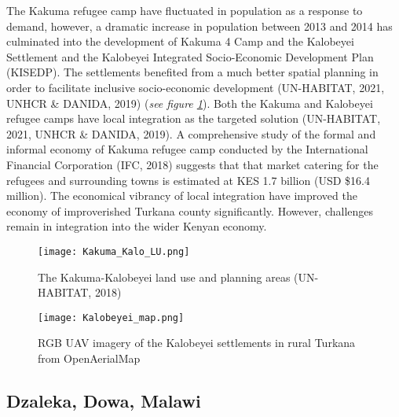 \documentclass[11pt, a4paper, twoside]{report}
\begin{document}
The Kakuma refugee camp have fluctuated in population as a response to demand, however, a dramatic increase in population between 2013 and 2014 has culminated into the development of Kakuma 4 Camp and the Kalobeyei Settlement and the Kalobeyei Integrated Socio-Economic Development Plan (KISEDP). The settlements benefited from a much better spatial planning in order to facilitate inclusive socio-economic development (UN-HABITAT, 2021, UNHCR \& DANIDA, 2019) (\textit{see figure \ref{fig:KU_KALO_LU}}). Both the Kakuma and Kalobeyei refugee camps have local integration as the targeted solution (UN-HABITAT, 2021, UNHCR \& DANIDA, 2019). A comprehensive study of the formal and informal economy of Kakuma refugee camp conducted by the International Financial Corporation (IFC, 2018) suggests that that market catering for the refugees and surrounding towns is estimated at KES 1.7 billion (USD \$16.4 million). The economical vibrancy of local integration have improved the economy of improverished Turkana county significantly. However, challenges remain in integration into the wider Kenyan economy.\\\par

\begin{figure}[H]
  \centering
  \texttt{[image: Kakuma\_Kalo\_LU.png]}
  \caption{The Kakuma-Kalobeyei land use and planning areas (UN-HABITAT, 2018)}
  \label{fig:KU_KALO_LU}
\end{figure}

\begin{figure}[H]
  \centering
  \texttt{[image: Kalobeyei\_map.png]}
  \caption{RGB UAV imagery of the Kalobeyei settlements in rural Turkana from OpenAerialMap}
  \label{fig:KBY_overview}
\end{figure}


\newpage

\subsection{Dzaleka, Dowa, Malawi}\label{Dzaleka}
\end{document}
